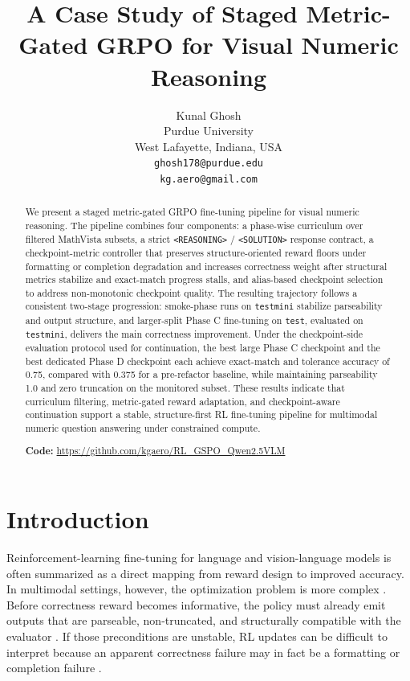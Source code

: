 \documentclass{article} %
\title{A Case Study of Staged Metric-Gated GRPO for Visual Numeric Reasoning}
\author{Kunal Ghosh\\
Purdue University\\
West Lafayette, Indiana, USA\\
\texttt{ghosh178@purdue.edu}\\
\texttt{kg.aero@gmail.com}}
\begin{document}
\maketitle
\fancyhead{}
\lhead{}
\chead{}
\rhead{}

\begin{abstract}
We present a staged metric-gated GRPO fine-tuning pipeline for visual numeric reasoning. The pipeline combines four components: a phase-wise curriculum over filtered MathVista subsets, a strict \texttt{<REASONING>} / \texttt{<SOLUTION>} response contract, a checkpoint-metric controller that preserves structure-oriented reward floors under formatting or completion degradation and increases correctness weight after structural metrics stabilize and exact-match progress stalls, and alias-based checkpoint selection to address non-monotonic checkpoint quality. The resulting trajectory follows a consistent two-stage progression: smoke-phase runs on \texttt{testmini} stabilize parseability and output structure, and larger-split Phase C fine-tuning on \texttt{test}, evaluated on \texttt{testmini}, delivers the main correctness improvement. Under the checkpoint-side evaluation protocol used for continuation, the best large Phase C checkpoint and the best dedicated Phase D checkpoint each achieve exact-match and tolerance accuracy of 0.75, compared with 0.375 for a pre-refactor baseline, while maintaining parseability 1.0 and zero truncation on the monitored subset. These results indicate that curriculum filtering, metric-gated reward adaptation, and checkpoint-aware continuation support a stable, structure-first RL fine-tuning pipeline for multimodal numeric question answering under constrained compute.

\textbf{Code:} \url{https://github.com/kgaero/RL_GSPO_Qwen2.5VLM}
\end{abstract}

\section{Introduction}

Reinforcement-learning fine-tuning for language and vision-language models is often summarized as a direct mapping from reward design to improved accuracy. In multimodal settings, however, the optimization problem is more complex \citep{yuan2025vlcogito}. Before correctness reward becomes informative, the policy must already emit outputs that are parseable, non-truncated, and structurally compatible with the evaluator \citep{shen2025satori}. If those preconditions are unstable, RL updates can be difficult to interpret because an apparent correctness failure may in fact be a formatting or completion failure \citep{shen2025satori}.
\end{document}
